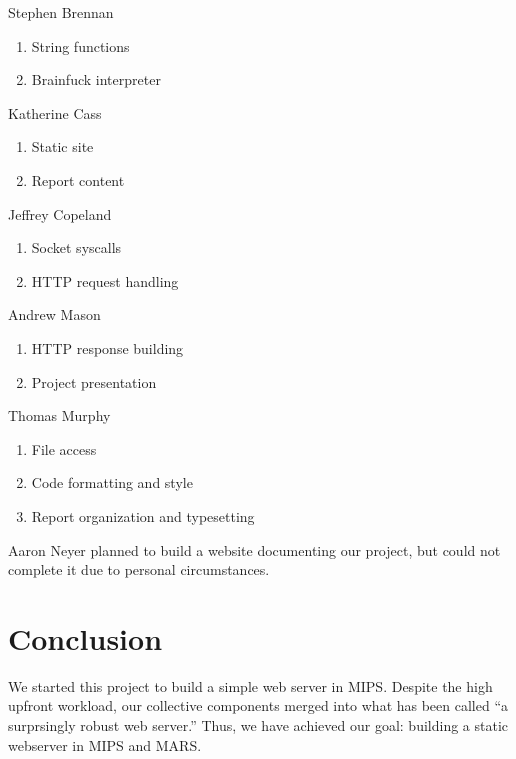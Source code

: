 \documentclass[journal,10pt]{IEEEtran}
\begin{document}
\begin{LaTeXitemize} \itemsep0pt \parskip0pt
  \item Stephen Brennan
  \begin{enumerate}
    \item String functions
    \item Brainfuck interpreter
  \end{enumerate}

  \item Katherine Cass
  \begin{enumerate}
    \item Static site
    \item Report content
  \end{enumerate}

  \item Jeffrey Copeland
  \begin{enumerate}
    \item Socket syscalls
    \item HTTP request handling
  \end{enumerate}

  \item Andrew Mason
  \begin{enumerate}
    \item HTTP response building
    \item Project presentation
  \end{enumerate}

  \item Thomas Murphy
  \begin{enumerate}
    \item File access
    \item Code formatting and style
    \item Report organization and typesetting
  \end{enumerate}

\end{LaTeXitemize}

Aaron Neyer planned to build a website documenting our project, but could not
complete it due to personal circumstances.

\section{Conclusion}

We started this project to build a simple web server in MIPS. Despite the high
upfront workload, our collective components merged into what has been called ``a
surprsingly robust web server.'' Thus, we have achieved our goal: building a
static webserver in MIPS and MARS.
\end{document}
